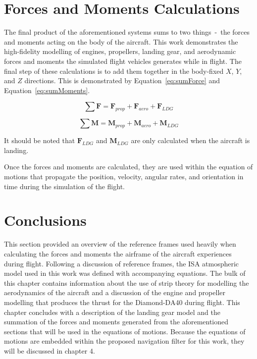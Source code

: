 \section{\textbf{Forces and Moments Calculations}}
The final product of the aforementioned systems sums to two things~-~the forces and moments acting on the body of the aircraft. This work demonstrates the high-fidelity modelling of engines, propellers, landing gear, and aerodynamic forces and moments the simulated flight vehicles generates while in flight. The final step of these calculations is to add them together in the body-fixed \(X\), \(Y\), and \(Z\) directions. This is demonstrated by Equation~\ref{eq:sumForce} and Equation~\ref{eq:sumMoments}.

\begin{equation}
    \sum \mathbf{F} = \mathbf{F}_{prop} + \mathbf{F}_{aero} + \mathbf{F}_{LDG}
    \label{eq:sumForce}
\end{equation}

\begin{equation}
    \sum \mathbf{M} = \mathbf{M}_{prop} + \mathbf{M}_{aero} + \mathbf{M}_{LDG}
    \label{eq:sumMoments}
\end{equation}

It should be noted that \(\mathbf{F}_{LDG}\) and \(\mathbf{M}_{LDG}\) are only calculated when the aircraft is landing.

Once the forces and moments are calculated, they are used within the equation of motions that propagate the position, velocity, angular rates, and orientation in time during the simulation of the flight.

\section{\textbf{Conclusions}}

This section provided an overview of the reference frames used heavily when calculating the forces and moments the airframe of the aircraft experiences during flight. Following a discussion of reference frames, the ISA atmospheric model used in this work was defined with accompanying equations. The bulk of this chapter contains information about the use of strip theory for modelling the aerodynamics of the aircraft and a discussion of the engine and propeller modelling that produces the thrust for the Diamond-DA40 during flight. This chapter concludes with a description of the landing gear model and the summation of the forces and moments generated from the aforementioned sections that will be used in the equations of motions. Because the equations of motions are embedded within the proposed navigation filter for this work, they will be discussed in chapter 4.
\clearpage